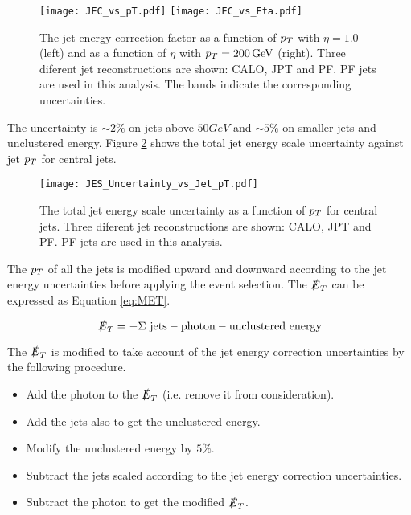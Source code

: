 \begin{figure}
\texttt{[image: JEC\_vs\_pT.pdf]}
\texttt{[image: JEC\_vs\_Eta.pdf]}
\caption{The jet energy correction factor as a function of $p_{T}$ with $\eta =
1.0$ (left) and as a function of $\eta$ with $p_{T} = 200 \, \mathrm{GeV}$ (right). 
Three diferent jet reconstructions are shown: CALO, JPT and PF. PF jets are used 
in this analysis. The bands indicate the corresponding uncertainties.}
\label{fig:JEC_vs_pT_And_Eta}
\end{figure}

The uncertainty is $\sim 2 \unit{\%}$ on jets above $50 \unit{GeV}$ and $\sim 5 
\unit{\%}$ on smaller jets and unclustered energy. Figure 
\ref{fig:JES_Uncertainty_vs_Jet_pT} shows the total jet energy scale uncertainty 
against jet $p_{T}$ for central jets. \\

\begin{figure}
\begin{center}
\texttt{[image: JES\_Uncertainty\_vs\_Jet\_pT.pdf]}
\end{center}
\caption{The total jet energy scale uncertainty as a function of $p_{T}$ for
central jets. Three diferent jet reconstructions are shown: CALO, JPT and PF. 
PF jets are used in this analysis.}
\label{fig:JES_Uncertainty_vs_Jet_pT}
\end{figure}

The $p_{T}$ of all the jets is modified upward and downward according to the jet 
energy uncertainties before applying the event selection. The $\slashed{E}_{T}$ can be 
expressed as Equation \ref{eq:MET}.

\begin{equation}
\slashed{E}_{T} = -\Sigma \mbox{ jets} - \mbox{photon} - \mbox{unclustered energy}
\label{eq:MET}
\end{equation}

The $\slashed{E}_{T}$ is modified to take account of the jet energy correction
uncertainties by the following procedure. 

\begin{itemize}
\item Add the photon to the $\slashed{E}_{T}$ (i.e. remove it from consideration).
\item Add the jets also to get the unclustered energy.
\item Modify the unclustered energy by $5\unit{\%}$.
\item Subtract the jets scaled according to the jet energy correction 
uncertainties.
\item Subtract the photon to get the modified $\slashed{E}_{T}$.
\end{itemize}

